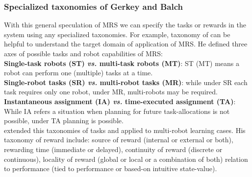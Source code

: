 \subsubsection*{Specialized taxonomies of Gerkey and Balch} 
With this general speculation of MRS we can specify the tasks or rewards in the system using any specialized taxonomies. For example, taxonomy of  can be helpful to understand the target domain of application of MRS. He defined three axes of possible tasks and robot capabilities of MRS:\\
\textbf{Single-task robots (ST) {\em vs.} multi-task robots (MT)}: ST (MT) means a robot can perform one (multiple) tasks at a time.\\
\textbf{Single-robot tasks (SR) {\em vs.} multi-robot tasks (MR)}: while under SR each task requires only one robot, under MR, multi-robots may be required.\\
\textbf{Instantaneous assignment (IA) {\em vs.} time-executed assignment (TA)}: While IA refers a situation when planning for future task-allocations is not possible, under TA planning is possible.\\
 extended this taxonomies of tasks and applied to multi-robot learning cases. His taxonomy of reward include: source of reward (internal or external or both), rewarding time (immediate or delayed), continuity of reward (discrete or continuous), locality of reward (global or local or a combination of both) relation to performance (tied to performance or based-on intuitive state-value).
